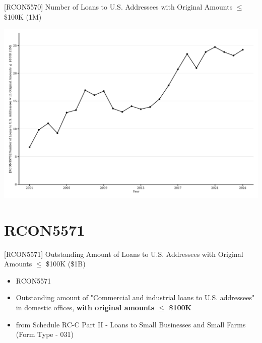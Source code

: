 \documentclass{beamer}
\begin{document}
\begin{frame}{[RCON5570] Number of Loans to U.S. Addressees with Original Amounts $\leq$ \$100K (1M)}
\begin{center}
\includegraphics[width=1\textwidth]{figures/Figure_RCON5570_Num_Loans_LE_100K.pdf}
\end{center}
\end{frame}


\section{RCON5571}

\begin{frame}{[RCON5571] Outstanding Amount of Loans to U.S. Addressees with Original Amounts $\leq$ \$100K (\$1B)}
\begin{itemize}
    \item RCON5571
    \item Outstanding amount of "Commercial and industrial loans to U.S. addressees" in domestic offices, \textbf{with original amounts $\leq$ \$100K}
    \item from Schedule RC-C Part II - Loans to Small Businesses and Small Farms (Form Type - 031)
\end{itemize}
\end{frame}
\end{document}
